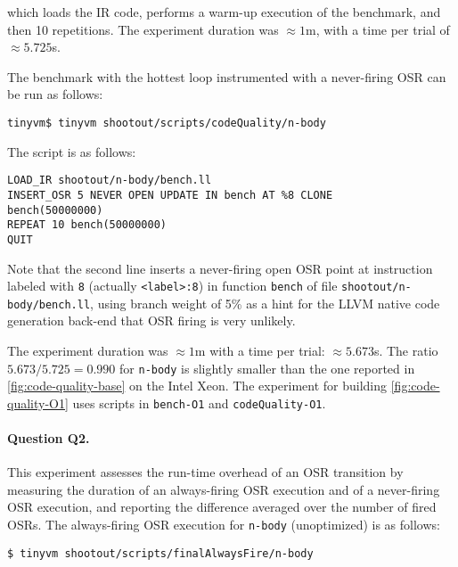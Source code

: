 \noindent which loads the IR code, performs a warm-up execution of the benchmark, and then 10 repetitions. The experiment duration was $\approx1$m, with a time per trial of $\approx5.725$s. 

The benchmark with the hottest loop instrumented with a never-firing OSR can be run as follows:

\begin{small}
\begin{verbatim}
tinyvm$ tinyvm shootout/scripts/codeQuality/n-body
\end{verbatim}
\end{small}

\noindent The script is as follows:

\begin{small}
\begin{verbatim}
LOAD_IR shootout/n-body/bench.ll
INSERT_OSR 5 NEVER OPEN UPDATE IN bench AT %8 CLONE
bench(50000000)
REPEAT 10 bench(50000000)
QUIT
\end{verbatim}
\end{small}

\noindent Note that the second line inserts a never-firing open OSR point at instruction labeled with {\tt 8} (actually {\tt <label>:8}) in function {\tt bench} of file {\tt shootout/n-body/bench.ll}, using branch weight of 5\% as a hint for the LLVM native code generation back-end that OSR firing is very unlikely. 

The experiment duration was $\approx1$m with a time per trial: $\approx5.673$s. The ratio $5.673/5.725=0.990$ for {\tt n-body} is slightly smaller than the one reported in \ref{fig:code-quality-base} on the Intel Xeon. The experiment for building \ref{fig:code-quality-O1} uses scripts in {\tt bench-O1} and {\tt codeQuality-O1}.

\paragraph{Question Q2.} This experiment assesses the run-time overhead of an OSR transition by measuring the duration of an always-firing OSR execution and of a never-firing OSR execution, and reporting the difference averaged over the number of fired OSRs. The always-firing OSR execution for {\tt n-body} (unoptimized) is as follows:
\begin{small}
\begin{verbatim}
$ tinyvm shootout/scripts/finalAlwaysFire/n-body
\end{verbatim}
\end{small}

